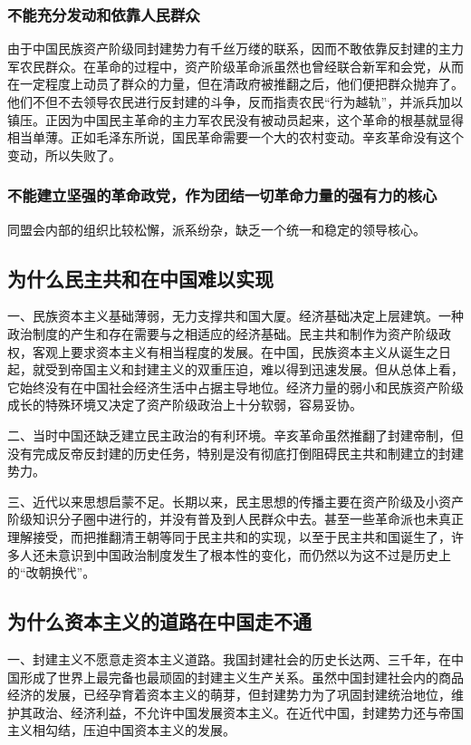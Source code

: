 \documentclass{article}
\begin{document}
\begin{CJK}{UTF8}{song}
\subsubsection{不能充分发动和依靠人民群众}
由于中国民族资产阶级同封建势力有千丝万缕的联系，因而不敢依靠反封建的主力军农民群众。在革命的过程中，资产阶级革命派虽然也曾经联合新军和会党，从而在一定程度上动员了群众的力量，但在清政府被推翻之后，他们便把群众抛弃了。他们不但不去领导农民进行反封建的斗争，反而指责农民“行为越轨”，并派兵加以镇压。正因为中国民主革命的主力军农民没有被动员起来，这个革命的根基就显得相当单薄。正如毛泽东所说，国民革命需要一个大的农村变动。辛亥革命没有这个变动，所以失败了。
\subsubsection{不能建立坚强的革命政党，作为团结一切革命力量的强有力的核心}
同盟会内部的组织比较松懈，派系纷杂，缺乏一个统一和稳定的领导核心。
\subsection{为什么民主共和在中国难以实现}
一、民族资本主义基础薄弱，无力支撑共和国大厦。经济基础决定上层建筑。一种政治制度的产生和存在需要与之相适应的经济基础。民主共和制作为资产阶级政权，客观上要求资本主义有相当程度的发展。在中国，民族资本主义从诞生之日起，就受到帝国主义和封建主义的双重压迫，难以得到迅速发展。但从总体上看，它始终没有在中国社会经济生活中占据主导地位。经济力量的弱小和民族资产阶级成长的特殊环境又决定了资产阶级政治上十分软弱，容易妥协。

二、当时中国还缺乏建立民主政治的有利环境。辛亥革命虽然推翻了封建帝制，但没有完成反帝反封建的历史任务，特别是没有彻底打倒阻碍民主共和制建立的封建势力。

三、近代以来思想启蒙不足。长期以来，民主思想的传播主要在资产阶级及小资产阶级知识分子圈中进行的，并没有普及到人民群众中去。甚至一些革命派也未真正理解接受，而把推翻清王朝等同于民主共和的实现，以至于民主共和国诞生了，许多人还未意识到中国政治制度发生了根本性的变化，而仍然以为这不过是历史上的“改朝换代”。
\subsection{为什么资本主义的道路在中国走不通}
一、封建主义不愿意走资本主义道路。我国封建社会的历史长达两、三千年，在中国形成了世界上最完备也最顽固的封建主义生产关系。虽然中国封建社会内的商品经济的发展，已经孕育着资本主义的萌芽，但封建势力为了巩固封建统治地位，维护其政治、经济利益，不允许中国发展资本主义。在近代中国，封建势力还与帝国主义相勾结，压迫中国资本主义的发展。


\end{CJK}
\end{document}
